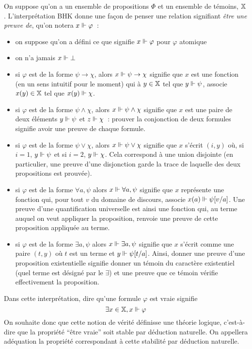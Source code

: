 \documentclass{article}
\begin{document}
On suppose qu'on a un ensemble de propositions $\Phi$ et un ensemble de témoins, $\mathbb X$. L'interprétation BHK donne une façon de penser une relation signifiant \textit{être une preuve de}, qu'on notera $x\Vdash \varphi$~:
\begin{itemize}
\item on suppose qu'on a défini ce que signifie $x\Vdash\varphi$ pour $\varphi$ atomique
\item on n'a jamais $x\Vdash \bot$
\item si $\varphi$ est de la forme $\psi\to \chi$, alors $x\Vdash\psi \to\chi$ signifie que $x$ est une fonction (en un sens intuitif pour le moment) qui à $y\in \mathbb X$ tel que $y\Vdash \psi$, associe $x(y)\in \mathbb X$ tel que $x(y)\Vdash \chi$.
\item si $\varphi$ est de la forme $\psi\land\chi$, alors $x\Vdash \psi\land \chi$ signifie que $x$ est une paire de deux éléments $y\Vdash \psi$ et $z\Vdash \chi$~: prouver la conjonction de deux formules signifie avoir une preuve de chaque formule.
\item si $\varphi$ est de la forme $\psi\lor\chi$, alors $x\Vdash\psi\lor \chi$ signifie que $x$ s'écrit $(i,y)$ où, si $i = 1$, $y\Vdash \psi$ et si $i = 2$, $y\Vdash \chi$. Cela correspond à une union disjointe (en particulier, une preuve d'une disjonction garde la trace de laquelle des deux propositions est prouvée).
\item si $\varphi$ est de la forme $\forall a, \psi$ alors $x\Vdash\forall a, \psi$ signifie que $x$ représente une fonction qui, pour tout $v$ du domaine de discours, associe $x(a)\Vdash \psi[v/a]$. Une preuve d'une quantification universelle est ainsi une fonction qui, au terme auquel on veut appliquer la proposition, renvoie une preuve de cette proposition appliquée au terme.
\item si $\varphi$ est de la forme $\exists a, \psi$ alors $x\Vdash \exists a, \psi$ signifie que $x$ s'écrit comme une paire $(t,y)$ où $t$ est un terme et $y\Vdash \psi[t/a]$. Ainsi, donner une preuve d'une proposition existentielle signifie donner un témoin du caractère existentiel (quel terme est désigné par le $\exists$) et une preuve que ce témoin vérifie effectivement la proposition.
\end{itemize}

Dans cette interprétation, dire qu'une formule $\varphi$ est vraie signifie
\[\exists x \in \mathbb X, x \Vdash \varphi\]
On souhaite donc que cette notion de vérité définisse une théorie logique, c'est-à-dire que la propriété ``être vraie'' soit stable par déduction naturelle. On appellera adéquation la propriété correspondant à cette stabilité par déduction naturelle.
\end{document}
